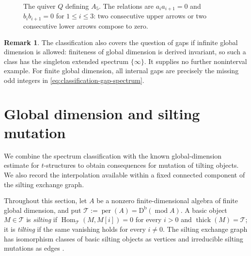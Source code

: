 \documentclass[11pt]{amsart}
\theoremstyle{definition}
\theoremstyle{plain}
\theoremstyle{definition}
\theoremstyle{definition}
\newtheorem{remark}[remark]{Remark}
\newcommand{\Db}{\mathrm D^{\mathrm b}}
\newcommand{\per}{\operatorname{per}}
\newcommand{\modu}{\operatorname{mod}}
\newcommand{\thick}{\operatorname{thick}}
\newcommand{\Hom}{\operatorname{Hom}}
\newcommand{\cT}{\mathcal T}
\begin{document}
\begin{figure}[htbp]
\centering
{}
\caption{The quiver $Q$ defining $A_5$.
The relations are $a_i a_{i+1}=0$ and
$b_i b_{i+1}=0$ for $1\leq i\leq3$:
two consecutive upper arrows or two consecutive lower
arrows compose to zero.}
\label{fig:counterexample-quiver}
\end{figure}

\begin{remark}
The classification also covers the question of gaps if infinite global
dimension is allowed: finiteness of global dimension is derived
invariant, so such a class has the singleton extended spectrum
$\{\infty\}$.  It supplies no further noninterval example.
For finite global dimension, all internal gaps are precisely the
missing odd integers in \eqref{eq:classification-gap-spectrum}.
\end{remark}

\appendix
\section{Global dimension and silting mutation}
\label{sec:HRS-components}

We combine the spectrum classification with the known
global-dimension estimate for $t$-structures to obtain
consequences for mutation of tilting objects. We also
record the interpolation available within a fixed
connected component of the silting exchange graph.

Throughout this section, let $A$ be a nonzero
finite-dimensional algebra of finite global dimension,
and put $\cT:=\per(A)=\Db(\modu A)$.
A basic object $M\in\cT$ is \emph{silting} if
$\Hom_{\cT}(M,M[i])=0$ for every $i>0$ and
$\thick(M)=\cT$; it is \emph{tilting} if the same
vanishing holds for every $i\neq0$.
The silting exchange graph has isomorphism classes of basic silting objects
as vertices and irreducible silting mutations as edges
\cite{AiharaIyama}.
\end{document}
